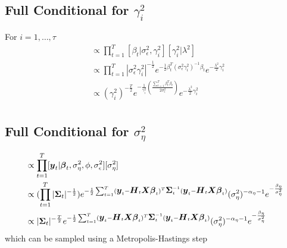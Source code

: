 \documentclass[fleqn]{article}
\def\bm#1{\mbox{\boldmath $#1$}}
\begin{document}
% 
\subsection{Full Conditional for $\gamma^2_i$}
For $i = 1, \ldots, \tau$
\begin{align*}
[\gamma^2_i | \cdot] & \propto \prod_{t = 1}^T [\beta_t | \sigma^2_\epsilon, \gamma^2_i] [\gamma^2_i | \lambda^2]\\
 & \propto \prod_{t = 1}^T |\sigma^2_\epsilon \gamma^2_i|^{ - \frac{1} {2}} e^{ - \frac{1} {2} \beta_t^T (\sigma^2_\epsilon \gamma^2_i)^{ - 1} \beta_t} e^{-\frac{\lambda^2} {2} \gamma^2_i}\\
%
& \propto (\gamma^2_i)^{ - \frac{T} {2}} e^{ - \frac{1} {\gamma^2_i}(\frac{\sum_{t = 1}^T \beta_t^T \beta_t} {2 \sigma^2_\epsilon})} e^{ - \frac{\lambda^2} {2} \gamma^2_i}\\
%
\end{align*}


\subsection{Full Conditional for $\sigma^2_\eta$}
%
\begin{align*}
[\sigma^2_\eta | \cdot] & \propto \prod_{t = 1}^T [\bm{y}_t | \bm{\beta}_t, \sigma^2_\eta, \phi, \sigma^2_\epsilon] [\sigma^2_\eta]\\
%
& \propto (\prod_{t = 1}^T |\bm{\Sigma}_t |^{ - \frac{1} {2}}) e^{ - \frac{1} {2} \sum_{t = 1}^T (\bm{y}_t - \bm{H}_t \bm{X} \bm{\beta}_t)^T \bm{\Sigma}_t^{ - 1} (\bm{y}_t - \bm{H}_t \bm{X} \bm{\beta}_t)} (\sigma^2_\eta)^{ - \alpha_\eta - 1} e^{ - \frac{\beta_\eta} {\sigma^2_\eta}}\\
%
& \propto |\bm{\Sigma}_t |^{ - \frac{T} {2}} e^{ - \frac{1} {2} \sum_{t = 1}^T (\bm{y}_t - \bm{H}_t \bm{X} \bm{\beta}_t)^T \bm{\Sigma}_t^{ - 1} (\bm{y}_t - \bm{H}_t \bm{X} \bm{\beta}_t)} (\sigma^2_\eta)^{ - \alpha_\eta - 1} e^{ - \frac{\beta_\eta} {\sigma^2_\eta}}\\
\end{align*}
% 
which can be sampled using a Metropolis-Hastings step
%
\end{document}
